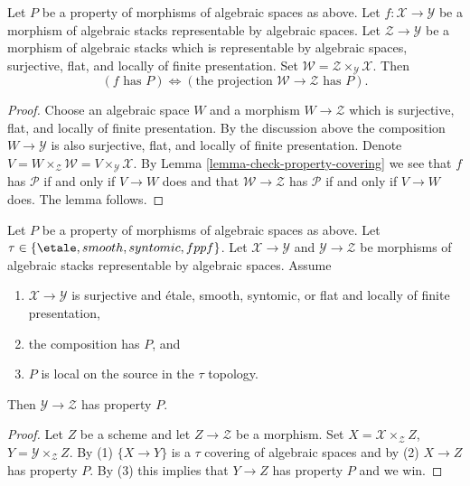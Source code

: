 \begin{lemma}
\label{lemma-check-property-weak-covering}
Let $P$ be a property of morphisms of algebraic spaces as above.
Let $f : \mathcal{X} \to \mathcal{Y}$ be a morphism of algebraic stacks
representable by algebraic spaces.
Let $\mathcal{Z} \to \mathcal{Y}$ be a morphism of algebraic stacks which
is representable by algebraic spaces, surjective, flat, and
locally of finite presentation.
Set $\mathcal{W} = \mathcal{Z} \times_\mathcal{Y} \mathcal{X}$. Then
$$
(f\text{ has }P) \Leftrightarrow
(\text{the projection }\mathcal{W} \to \mathcal{Z}\text{ has }P).
$$
\end{lemma}

\begin{proof}
Choose an algebraic space $W$ and a morphism
$W \to \mathcal{Z}$ which is surjective, flat, and locally of finite
presentation. By the discussion above the composition
$W \to \mathcal{Y}$ is also surjective, flat, and locally of finite
presentation. Denote
$V = W \times_\mathcal{Z} \mathcal{W} = V \times_\mathcal{Y} \mathcal{X}$.
By
Lemma \ref{lemma-check-property-covering}
we see that $f$ has $\mathcal{P}$ if and only if $V \to W$ does
and that $\mathcal{W} \to \mathcal{Z}$ has $\mathcal{P}$ if and only
if $V \to W$ does. The lemma follows.
\end{proof}

\begin{lemma}
\label{lemma-check-property-after-precomposing}
Let $P$ be a property of morphisms of algebraic spaces as above.
Let $\tau \in \{\etale, smooth, syntomic, fppf\}$.
Let $\mathcal{X} \to \mathcal{Y}$ and $\mathcal{Y} \to \mathcal{Z}$
be morphisms of algebraic stacks representable by algebraic spaces.
Assume
\begin{enumerate}
\item $\mathcal{X} \to \mathcal{Y}$ is surjective and
\'etale, smooth, syntomic, or flat and locally of finite presentation,
\item the composition has $P$, and
\item $P$ is local on the source in the $\tau$ topology.
\end{enumerate}
Then $\mathcal{Y} \to \mathcal{Z}$ has property $P$.
\end{lemma}

\begin{proof}
Let $Z$ be a scheme and let $Z \to \mathcal{Z}$ be a morphism.
Set $X = \mathcal{X} \times_\mathcal{Z} Z$,
$Y = \mathcal{Y} \times_\mathcal{Z} Z$. By (1) $\{X \to Y\}$
is a $\tau$ covering of algebraic spaces and by (2) $X \to Z$ has property
$P$. By (3) this implies that $Y \to Z$ has property $P$
and we win.
\end{proof}

